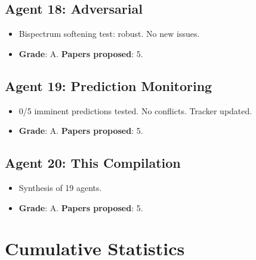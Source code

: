 \documentclass[11pt,a4paper]{article}
\begin{document}
\subsection{Agent 18: Adversarial}
\begin{itemize}[nosep]
\item Bispectrum softening test: robust. No new issues.
\item \textbf{Grade}: A. \textbf{Papers proposed}: 5.
\end{itemize}

\subsection{Agent 19: Prediction Monitoring}
\begin{itemize}[nosep]
\item 0/5 imminent predictions tested. No conflicts. Tracker updated.
\item \textbf{Grade}: A. \textbf{Papers proposed}: 5.
\end{itemize}

\subsection{Agent 20: This Compilation}
\begin{itemize}[nosep]
\item Synthesis of 19 agents.
\item \textbf{Grade}: A. \textbf{Papers proposed}: 5.
\end{itemize}

\section{Cumulative Statistics}
\end{document}
